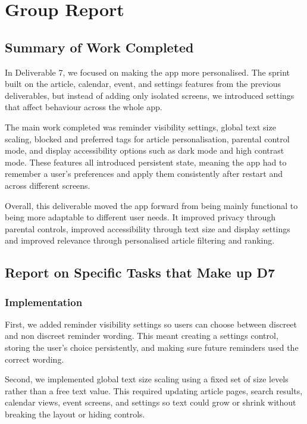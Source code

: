 \documentclass[a4paper, 12pt]{article}
\begin{document}
    \section{Group Report}
    \subsection{Summary of Work Completed}
    In Deliverable 7, we focused on making the app more personalised. The sprint
    built on the article, calendar, event, and settings features from the
    previous deliverables, but instead of adding only isolated screens, we
    introduced settings that affect behaviour across the whole app.

    The main work completed was reminder visibility settings, global text size scaling,
    blocked and preferred tags for article personalisation, parental control mode,
    and display accessibility options such as dark mode and high contrast mode. These
    features all introduced persistent state, meaning the app had to remember a
    user's preferences and apply them consistently after restart and across
    different screens.

    Overall, this deliverable moved the app forward from being mainly functional
    to being more adaptable to different user needs. It improved privacy through
    parental controls, improved accessibility through text size and display settings
    and improved relevance through personalised article filtering and ranking.
    \subsection{Report on Specific Tasks that Make up D7}
    \subsubsection{Implementation}

    First, we added reminder visibility settings so users can choose between
    discreet and non discreet reminder wording. This meant creating a settings control,
    storing the user's choice persistently, and making sure future reminders used
    the correct wording.

    Second, we implemented global text size scaling using a fixed set of size
    levels rather than a free text value. This required updating article pages,
    search results, calendar views, event screens, and settings so text could grow
    or shrink without breaking the layout or hiding controls.
\end{document}
